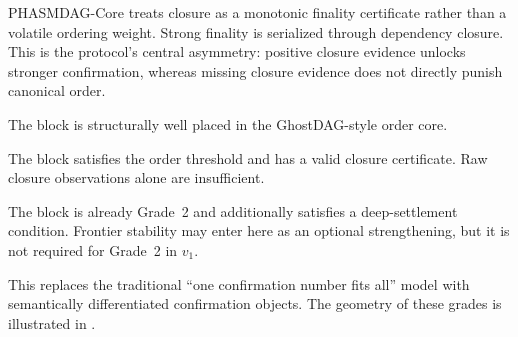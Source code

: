 \documentclass[11pt]{article}
\theoremstyle{definition}
\theoremstyle{plain}
\theoremstyle{remark}
\begin{document}
PHASMDAG-Core treats closure as a monotonic finality certificate rather than a
volatile ordering weight.
Strong finality is serialized through dependency closure.
This is the protocol's central asymmetry:
positive closure evidence unlocks stronger confirmation, whereas missing
closure evidence does not directly punish canonical order.

\begin{description}[nosep]
    \item[Grade 1 --- Tentative Ordering]
    The block is structurally well placed in the GhostDAG-style order core.

    \item[Grade 2 --- Closure-Certified Strong Confirmation]
    The block satisfies the order threshold and has a valid closure
    certificate.
    Raw closure observations alone are insufficient.

    \item[Grade 3 --- Deep Settlement]
    The block is already Grade~2 and additionally satisfies a deep-settlement
    condition.
    Frontier stability may enter here as an optional strengthening, but it is
    not required for Grade~2 in $v_1$.
\end{description}

This replaces the traditional ``one confirmation number fits all'' model with
semantically differentiated confirmation objects.
The geometry of these grades is illustrated in .
\end{document}
